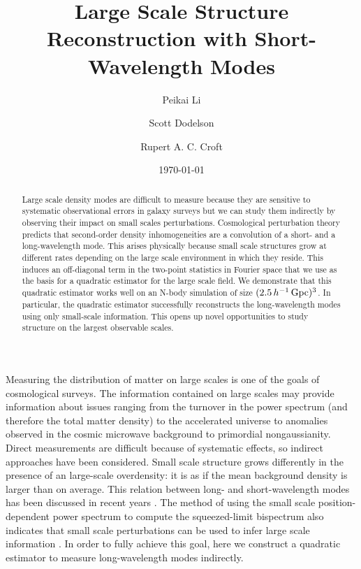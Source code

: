 \documentclass[prd,amsmath,amssymb,floatfix,superscriptaddress,nofootinbib,twocolumn]{revtex4-1}
\begin{document}
\title{Large Scale Structure Reconstruction with Short-Wavelength Modes}
\author{\large Peikai Li}
\author{\large Scott Dodelson}
\author{\large Rupert A. C. Croft}

\date{\today}
\begin{abstract}
\noindent Large scale density modes are difficult to measure because they are sensitive to systematic observational errors in galaxy surveys but we can study them indirectly by observing their impact on small scales perturbations. Cosmological perturbation theory predicts that second-order density inhomogeneities are a convolution of a short- and a long-wavelength mode. This arises physically because small scale structures grow at different rates depending on the large scale environment in which they reside. This induces an off-diagonal term in the two-point statistics in Fourier space that we use as the basis for a quadratic estimator for the large scale field. We demonstrate that this quadratic estimator works well on an N-body simulation of size  $(2.5\,h^{-1}\,\rm Gpc)^3$. In particular, the quadratic estimator successfully reconstructs the long-wavelength modes using only small-scale information. This opens up novel opportunities to study structure on the largest observable scales. 

\end{abstract}
\maketitle
{}
Measuring the distribution of matter on large scales is one of the goals of cosmological surveys. The information contained on large scales may provide information about issues ranging from the turnover in the power spectrum (and therefore the total matter density) to the accelerated universe to anomalies observed in the cosmic microwave background to primordial nongaussianity. Direct measurements are difficult because of systematic effects, so indirect approaches have been considered. Small scale structure grows differently in the presence of an large-scale overdensity: it is as if the mean background density is larger than on average. This relation between long- and short-wavelength modes has been discussed in recent years \cite{Baldauf:2011fer}\cite{Barreira:2017res}. The method of using the small scale position-dependent power spectrum to compute the squeezed-limit bispectrum also indicates that small scale perturbations can be used to infer large scale information \cite{Chiang:2014pos}\cite{Chiang:2015poss}. In order to fully achieve this goal, here we construct a quadratic estimator to measure long-wavelength modes indirectly. 
\end{document}
